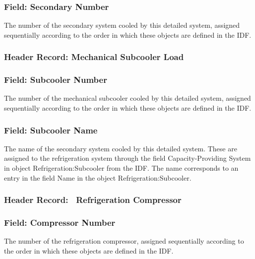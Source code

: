 \subsubsection{Field: Secondary Number}\label{field-secondary-number}

The number of the secondary system cooled by this detailed system, assigned sequentially according to the order in which these objects are defined in the IDF.

\subsubsection{Header Record: Mechanical Subcooler Load}\label{header-record-mechanical-subcooler-load}

\subsubsection{Field: Subcooler Number}\label{field-subcooler-number}

The number of the mechanical subcooler cooled by this detailed system, assigned sequentially according to the order in which these objects are defined in the IDF.

\subsubsection{Field: Subcooler Name}\label{field-subcooler-name}

The name of the secondary system cooled by this detailed system. These are assigned to the refrigeration system through the field Capacity-Providing System in object Refrigeration:Subcooler from the IDF. The name corresponds to an entry in the field Name in the object Refrigeration:Subcooler.

\subsubsection{Header Record:~ Refrigeration Compressor}\label{header-record-refrigeration-compressor}

\subsubsection{Field: Compressor Number}\label{field-compressor-number}

The number of the refrigeration compressor, assigned sequentially according to the order in which these objects are defined in the IDF.

